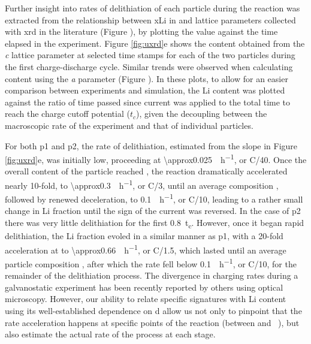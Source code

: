 \documentclass{article}
\begin{document}
\newpage %
Further insight into rates of delithiation of each particle during the
reaction was extracted from the relationship between \gls{xLi} in
 and lattice parameters collected with \gls{xrd} in the
literature\cite{robert2015} (Figure ), by
plotting the value against the time elapsed in the experiment. Figure
\ref{fig:uxrd}e shows the  content obtained from the \emph{c}
lattice parameter at selected time stamps for each of the two 
particles during the first charge-discharge cycle. Similar trends were
observed when calculating  content using the \emph{a} parameter
(Figure ). In these plots, to allow for an easier
comparison between experiments and simulation, the Li content was
plotted against the ratio of time passed since current was applied to
the total time to reach the charge cutoff potential ($t_c$), given the
decoupling between the macroscopic rate of the experiment and that of
individual particles.

For both \gls{p1} and \gls{p2}, the rate of delithiation, estimated
from the slope in Figure \ref{fig:uxrd}e, was initially low,
proceeding at \SI{\approx0.025}{\per\hour}, or C/40. Once the
overall content of the particle reached , the reaction
dramatically accelerated nearly 10-fold, to
\SI{\approx0.3}{\per\hour}, or C/3, until an average
composition , followed by renewed deceleration, to
\SI{0.1}{\per\hour}, or C/10, leading to a rather small change
in Li fraction until the sign of the current was reversed. In the case
of \gls{p2} there was very little delithiation for the first
\SI{0.8}{t_c}. However, once it began rapid delithiation, the Li
fraction evoled in a similar manner as \gls{p1}, with a 20-fold
acceleration at  to \SI{\approx0.66}{\per\hour}, or
C/1.5, which lasted until an average particle composition ,
after which the rate fell below \SI{0.1}{\per\hour}, or C/10,
for the remainder of the delithiation process. The divergence in
charging rates during a galvanostatic experiment has been recently
reported by others using optical microscopy\cite{zhao2022}. However, our ability to
relate specific signatures with Li content using its well-established
dependence on \gls{d} allow us not only to pinpoint that the rate
acceleration happens at specific points of the reaction (between
 and ~), but also estimate the actual rate of the
process at each stage.
\end{document}
